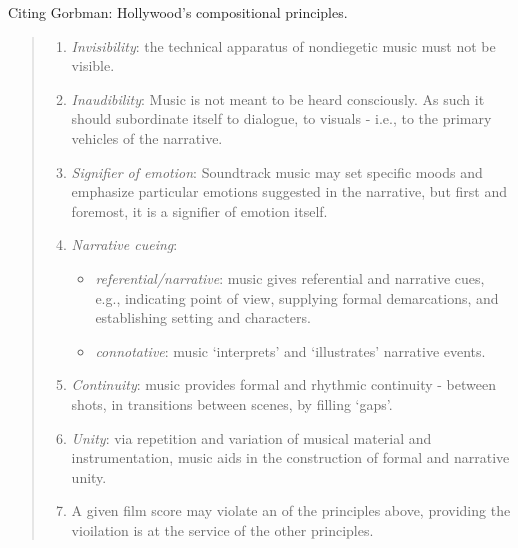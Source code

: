 Citing Gorbman: Hollywood's compositional principles.
\begin{quotation}

\begin{enumerate}
\item  \textit{Invisibility}: the technical apparatus of nondiegetic music must not be visible.
\item \textit{Inaudibility}: Music is not meant to be heard consciously. As such it should subordinate itself to dialogue, to visuals - i.e., to the primary vehicles of the narrative.
\item \textit{Signifier of emotion}: Soundtrack music may set specific moods and emphasize particular emotions suggested in the narrative, but first and foremost, it is a signifier of emotion itself.
\item \textit{Narrative cueing}: 
\begin{itemize}
\item \textit{referential/narrative}: music gives referential and narrative cues, e.g., indicating point of view, supplying formal demarcations, and establishing setting and characters.
\item \textit{connotative}: music `interprets' and `illustrates' narrative events.
\end{itemize}
\item \textit{Continuity}: music provides formal and rhythmic continuity - between shots, in transitions between scenes, by filling `gaps'.
\item \textit{Unity}: via repetition and variation of musical material and instrumentation, music aids in the construction of formal and narrative unity.
\item A given film score may violate an of the principles above, providing the vioilation is at the service of the other principles.

\end{enumerate}
\end{quotation}


